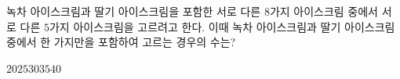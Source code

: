 \hspace*{2mm}\begin{minipage}[t]{\dimexpr\linewidth-2mm\relax}\vspace{0pt}
녹차 아이스크림과 딸기 아이스크림을 포함한 서로 다른 $8$가지 아이스크림 중에서 서로 다른 $5$가지 아이스크림을 고르려고 한다. 이때 녹차 아이스크림과 딸기 아이스크림 중에서 한 가지만을 포함하여 고르는 경우의 수는?
\begin{choices32}{$20$}{$25$}{$30$}{$35$}{$40$}\end{choices32}\end{minipage}
